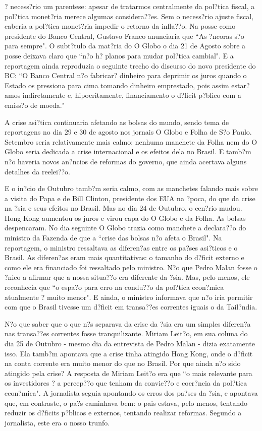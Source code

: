 \documentclass{article}
\begin{document}
? necess?rio um parentese: apesar de tratarmos centralmente da pol?tica fiscal, a pol?tica monet?ria merece algumas considera??es. Sem o necess?rio ajuste fiscal, caberia a pol?tica monet?ria impedir o retorno da infla??o. Na posse como presidente do Banco Central, Gustavo Franco anunciaria que ``As ?ncoras s?o para sempre". O subt?tulo da mat?ria do O Globo o dia 21 de Agosto sobre a posse deixava claro que ``n?o h? planos para mudar pol?tica cambial". E a reportagem ainda reproduzia o seguinte trecho do discurso do novo presidente do BC: ``O Banco Central n?o fabricar? dinheiro para deprimir os juros quando o Estado os pressiona para cima tomando dinheiro emprestado, pois assim estar?amos indiretamente e, hipocritamente, financiamento o d?ficit p?blico com a emiss?o de moeda."

A crise asi?tica continuaria afetando as bolsas do mundo, sendo tema de reportagens no dia 29 e 30 de agosto nos jornais O Globo e Folha de S?o Paulo. Setembro seria relativamente mais calmo: nenhuma manchete da Folha nem do O Globo seria dedicada a crise internacional e os efeitos dela no Brasil. E tamb?m n?o haveria novos an?ncios de reformas do governo, que ainda acertava alguns detalhes da reelei??o.

E o in?cio de Outubro tamb?m seria calmo, com as manchetes falando mais sobre a visita do Papa e de Bill Clinton, presidente dos EUA na ?poca, do que da crise na ?sia e seus efeitos no Brasil. Mas no dia 24 de Outubro, o cen?rio mudou. Hong Kong aumentou os juros e virou capa do O Globo e da Folha. As bolsas despencaram. No dia seguinte O Globo trazia como manchete a declara??o do ministro da Fazenda de que a ``crise das bolsas n?o afeta o Brasil". Na reportagem, o ministro ressaltava as diferen?as entre os pa?ses asi?ticos e o Brasil. As diferen?as eram mais quantitativas: o tamanho do d?ficit externo e como ele era financiado foi ressaltado pelo ministro. N?o que Pedro Malan fosse o ?nico a afirmar que a nossa situa??o era diferente da ?sia. Mas, pelo menos, ele reconhecia que ``o espa?o para erro na condu??o da pol?tica econ?mica atualmente ? muito menor". E ainda, o ministro informava que n?o iria permitir com que o Brasil tivesse um d?ficit em transa??es correntes iguais o da Tail?ndia.        
 
N?o que saber que o que n?s separava da crise da ?sia era um simples diferen?a nas transa??es correntes fosse tranquilizante. Miriam Leit?o, em sua coluna do dia 25 de Outubro - mesmo dia da entrevista de Pedro Malan - dizia exatamente isso. Ela tamb?m apontava que a crise tinha atingido Hong Kong, onde o d?ficit na conta corrente era muito menor do que no Brasil. Por que ainda n?o sido atingido pela crise? A resposta de Miriam Leit?o era que ``o mais relevante para os investidores ? a percep??o que tenham da convic??o e coer?ncia da pol?tica econ?mica". A jornalista seguia apontando os erros dos pa?ses da ?sia, e apontava que, em contraste, o pa?s caminhava bem: o pais estava, pelo menos, tentando reduzir os d?ficits p?blicos e externos, tentando realizar reformas. Segundo a jornalista, este era o nosso trunfo. 
\end{document}
